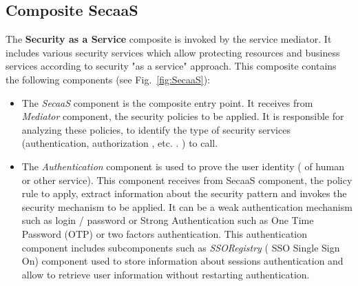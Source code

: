 \documentclass[runningheads,a4paper]{llncs}
\begin{document}
\subsection{Composite SecaaS}

The \textbf{Security as a Service} composite is invoked by the service mediator. It includes various security services which allow protecting resources and business services according to security "as a service" approach. This composite contains the following components (see Fig.~\ref{fig:SecaaS}):


\begin{itemize}
\settowidth{\leftmargin}{{\Large$\square$}}\advance\leftmargin{}
\itemsep8pt\relax
\renewcommand\labelitemi{{\lower1.5pt\hbox{\Large$\square$}}}

\item The \emph{SecaaS} component is the composite entry point. It receives from \emph{Mediator} component, the security policies to be applied. It is responsible for analyzing these policies, to identify the type of security services (authentication, authorization , etc. . ) to call.
\item The \emph{Authentication} component is used to prove the user identity  ( of human or other service). This component receives from SecaaS component, the policy rule to apply, extract information about the security pattern and invokes the security mechanism to be applied. It can be a weak authentication mechanism such as login / password or Strong Authentication such as One Time Password (OTP) or two factors authentication. This authentication component includes subcomponents such as \emph{SSORegistry} ( SSO Single Sign On) component used to store information about sessions authentication  and allow to retrieve user information without restarting authentication.


\end{itemize}
\end{document}
